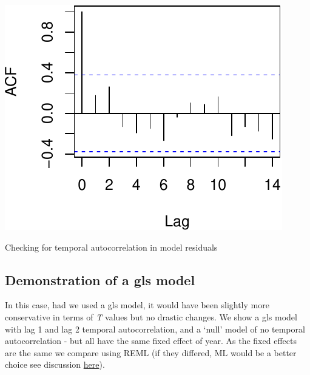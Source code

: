\documentclass[nofonts,]{tufte-handout}
\begin{document}
\begin{marginfigure}
\includegraphics{Technical-supplement_files/figure-latex/firstacf-1} \caption[Checking for temporal autocorrelation in model residuals]{Checking for temporal autocorrelation in model residuals}\label{fig:firstacf}
\end{marginfigure}

\hypertarget{demonstration-of-a-gls-model}{%
\subsection{Demonstration of a gls
model}\label{demonstration-of-a-gls-model}}

In this case, had we used a gls model, it would have been slightly more
conservative in terms of \emph{T} values but no drastic changes. We show
a gls model with lag 1 and lag 2 temporal autocorrelation, and a `null'
model of no temporal autocorrelation - but all have the same fixed
effect of year. As the fixed effects are the same we compare using REML
(if they differed, ML would be a better choice see discussion
\href{https://stats.stackexchange.com/questions/16013/allowed-comparisons-of-mixed-effects-models-random-effects-primarily/16015\#16015}{here}).
\end{document}
